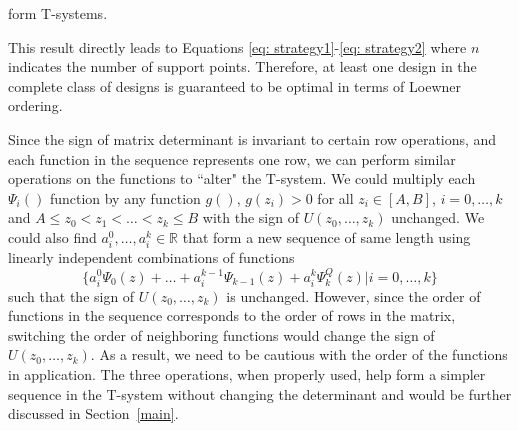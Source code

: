 \documentclass[12pt]{TD-CJS}
\begin{document}
     form T-systems. 

This result directly leads to Equations \eqref{eq: strategy1}-\eqref{eq: strategy2} where $n$ indicates the number of support points. Therefore, at least one design in the complete class of designs is guaranteed to be optimal in terms of Loewner ordering. 

Since the sign of matrix determinant is invariant to certain row operations, and each function in the sequence represents one row, we can perform similar operations on the functions to ``alter" the T-system.  We could multiply each $\Psi_i()$ function by any function $g()$, $g(z_i)>0$ for all $z_i\in [A,B]$, $i=0,\ldots,k$ and $A\le z_0 <z_1< \ldots< z_k\le B$ with the sign of $U(z_0,\ldots,z_k)$ unchanged. We could also find $a^0_i,\ldots,a^k_i\in \mathbb{R}$ that form a new sequence of same length using linearly independent combinations of functions \[\{a^0_i\Psi_0(z)+\ldots+a^{k-1}_i\Psi_{k-1}(z)+a^k_i\Psi_k^Q(z) | i=0,\ldots,k\}\] such that the sign of $U(z_0,\ldots,z_k)$ is unchanged. However, since the order of functions in the sequence corresponds to the order of rows in the matrix, switching the order of neighboring functions would change the sign of $U(z_0,\ldots,z_k)$. As a result, we need to be cautious with the order of the functions in application. The three operations, when properly used, help form a simpler sequence in the T-system without changing the determinant and would be further discussed in Section~\ref{main}.
\end{document}
